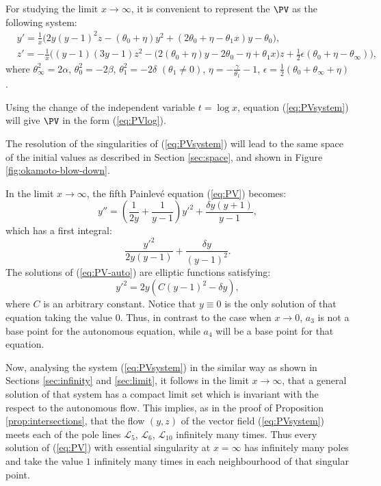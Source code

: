 For studying the limit $x\to\infty$, it is convenient to represent the $\PV$ as the following system:
\begin{equation}\label{eq:PVsystem}
\begin{split}
&y'=\frac1x\big(
2y(y-1)^2z-(\theta_0+\eta)y^2+(2\theta_0+\eta-\theta_1x)y-\theta_0
    \big),
\\
&z'=-\frac1x\bigg(
(y-1)(3y-1)z^2-\big(2(\theta_0+\eta)y-2\theta_0-\eta+\theta_1x\big)z
+\frac12\epsilon(\theta_0+\eta-\theta_{\infty})
\bigg),
\end{split}
\end{equation}
where
$\theta_{\infty}^2=2\alpha$,
$\theta_0^2=-2\beta$,
$\theta_1^2=-2\delta$ $(\theta_1\neq0)$,
$\eta=-\frac{\gamma}{\theta_1}-1$,
$\epsilon=\frac12(\theta_0+\theta_{\infty}+\eta)$.

\begin{remark}
Using the change of the independent variable $t=\log x$, equation (\ref{eq:PVsystem}) will give $\PV$ in the form (\ref{eq:PVlog}). 
\end{remark}


The resolution of the singularities of (\ref{eq:PVsystem}) will lead to the same space of the initial values as described in Section \ref{sec:space}, and shown in Figure \ref{fig:okamoto-blow-down}.

In the limit $x\to\infty$, the fifth Painlev\'e equation (\ref{eq:PV}) becomes:
\begin{equation}\label{eq:PV-auto}
y''=\left(\frac{1}{2y}+\frac{1}{y-1}\right) y'^2+\frac{\delta y(y+1)}{y-1},
\end{equation}
which has a first integral:
$$
\frac{y'^2}{2y(y-1)}+\frac{\delta y}{(y-1)^2}.
$$
The solutions of (\ref{eq:PV-auto}) are elliptic functions satisfying:
$$
y'^2=2y\left(C(y-1)^2 - \delta y\right),
$$
where $C$ is an arbitrary constant.
Notice that $y\equiv0$ is the only solution of that equation taking the value $0$.
Thus, in contrast to the case when $x\to0$, $a_3$ is not a base point for the autonomous equation, while $a_4$ will be a base point for that equation.

Now, analysing the system (\ref{eq:PVsystem}) in the similar way as shown in Sections \ref{sec:infinity} and \ref{sec:limit}, 
it follows in the limit $x\to\infty$, that a general solution of that system has a compact limit set which is invariant with the respect to the autonomous flow.
This implies, as in the proof of Proposition \ref{prop:intersections}, that the flow $(y,z)$ of the vector field (\ref{eq:PVsystem}) meets each of the pole lines $\mathcal{L}_5$, $\mathcal{L}_6$, $\mathcal{L}_{10}$ infinitely many times.
Thus every solution of (\ref{eq:PV}) with essential singularity at $x=\infty$ has infinitely many poles and take the value $1$ infinitely many times in each neighbourhood of that singular point.



